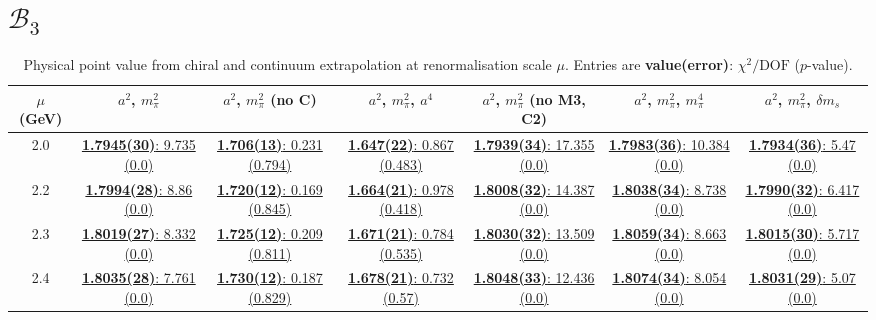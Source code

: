 \documentclass[12pt]{extarticle}
\begin{document}
\section{$\mathcal{B}_3$}
\begin{table}[h!]
\begin{center}
\begin{tabular}{|c|c|c|c|c|c|c|}
\hline
$\mu$ (GeV) & $a^2$, $m_\pi^2$& $a^2$, $m_\pi^2$ (no C)& $a^2$, $m_\pi^2$, $a^4$& $a^2$, $m_\pi^2$ (no M3, C2)& $a^2$, $m_\pi^2$, $m_\pi^4$& $a^2$, $m_\pi^2$, $\delta m_s$\\
\hline
2.0& \hyperlink{SSmPP/NPR/bag_a2m2_20.pdf.1}{\textbf{1.7945(30)}: 9.735 (0.0)} & \hyperlink{SSmPP/NPR/bag_a2m2noC_20.pdf.1}{\textbf{1.706(13)}: 0.231 (0.794)} & \hyperlink{SSmPP/NPR/bag_a2a4m2_20.pdf.1}{\textbf{1.647(22)}: 0.867 (0.483)} & \hyperlink{SSmPP/NPR/bag_a2m2mcut_20.pdf.1}{\textbf{1.7939(34)}: 17.355 (0.0)} & \hyperlink{SSmPP/NPR/bag_a2m2m4_20.pdf.1}{\textbf{1.7983(36)}: 10.384 (0.0)} & \hyperlink{SSmPP/NPR/bag_a2m2delm_20.pdf.1}{\textbf{1.7934(36)}: 5.47 (0.0)}\\
2.2& \hyperlink{SSmPP/NPR/bag_a2m2_22.pdf.1}{\textbf{1.7994(28)}: 8.86 (0.0)} & \hyperlink{SSmPP/NPR/bag_a2m2noC_22.pdf.1}{\textbf{1.720(12)}: 0.169 (0.845)} & \hyperlink{SSmPP/NPR/bag_a2a4m2_22.pdf.1}{\textbf{1.664(21)}: 0.978 (0.418)} & \hyperlink{SSmPP/NPR/bag_a2m2mcut_22.pdf.1}{\textbf{1.8008(32)}: 14.387 (0.0)} & \hyperlink{SSmPP/NPR/bag_a2m2m4_22.pdf.1}{\textbf{1.8038(34)}: 8.738 (0.0)} & \hyperlink{SSmPP/NPR/bag_a2m2delm_22.pdf.1}{\textbf{1.7990(32)}: 6.417 (0.0)}\\
2.3& \hyperlink{SSmPP/NPR/bag_a2m2_23.pdf.1}{\textbf{1.8019(27)}: 8.332 (0.0)} & \hyperlink{SSmPP/NPR/bag_a2m2noC_23.pdf.1}{\textbf{1.725(12)}: 0.209 (0.811)} & \hyperlink{SSmPP/NPR/bag_a2a4m2_23.pdf.1}{\textbf{1.671(21)}: 0.784 (0.535)} & \hyperlink{SSmPP/NPR/bag_a2m2mcut_23.pdf.1}{\textbf{1.8030(32)}: 13.509 (0.0)} & \hyperlink{SSmPP/NPR/bag_a2m2m4_23.pdf.1}{\textbf{1.8059(34)}: 8.663 (0.0)} & \hyperlink{SSmPP/NPR/bag_a2m2delm_23.pdf.1}{\textbf{1.8015(30)}: 5.717 (0.0)}\\
2.4& \hyperlink{SSmPP/NPR/bag_a2m2_24.pdf.1}{\textbf{1.8035(28)}: 7.761 (0.0)} & \hyperlink{SSmPP/NPR/bag_a2m2noC_24.pdf.1}{\textbf{1.730(12)}: 0.187 (0.829)} & \hyperlink{SSmPP/NPR/bag_a2a4m2_24.pdf.1}{\textbf{1.678(21)}: 0.732 (0.57)} & \hyperlink{SSmPP/NPR/bag_a2m2mcut_24.pdf.1}{\textbf{1.8048(33)}: 12.436 (0.0)} & \hyperlink{SSmPP/NPR/bag_a2m2m4_24.pdf.1}{\textbf{1.8074(34)}: 8.054 (0.0)} & \hyperlink{SSmPP/NPR/bag_a2m2delm_24.pdf.1}{\textbf{1.8031(29)}: 5.07 (0.0)}\\
\hline
\end{tabular}
\caption{Physical point value from chiral and continuum extrapolation at renormalisation scale $\mu$. Entries are \textbf{value(error)}: $\chi^2/\text{DOF}$ ($p$-value).}
\end{center}
\end{table}
\end{document}
